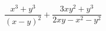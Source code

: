 \begin{ex}[type=expression]
	\begin{condition}
		\( \dfrac{x^3+y^3}{(x-y)^2}+\dfrac{3xy^2+y^3}{2xy-x^2-y^2} \)
	\end{condition}
\end{ex}